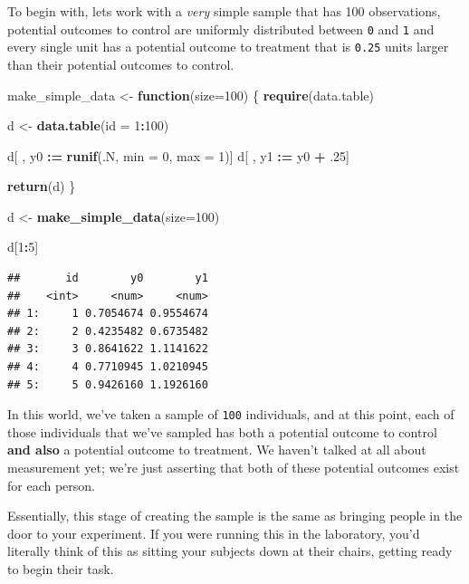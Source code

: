 \documentclass[
]{article}
\newenvironment{Shaded}{\begin{snugshade}}{\end{snugshade}}
\newcommand{\AttributeTok}[1]{\textcolor[rgb]{0.13,0.29,0.53}{#1}}
\newcommand{\ControlFlowTok}[1]{\textcolor[rgb]{0.13,0.29,0.53}{\textbf{#1}}}
\newcommand{\DecValTok}[1]{\textcolor[rgb]{0.00,0.00,0.81}{#1}}
\newcommand{\FunctionTok}[1]{\textcolor[rgb]{0.13,0.29,0.53}{\textbf{#1}}}
\newcommand{\NormalTok}[1]{#1}
\newcommand{\OtherTok}[1]{\textcolor[rgb]{0.56,0.35,0.01}{#1}}
\newcommand{\SpecialCharTok}[1]{\textcolor[rgb]{0.81,0.36,0.00}{\textbf{#1}}}
\theoremstyle{definition}
\theoremstyle{definition}
\theoremstyle{definition}
\theoremstyle{definition}
\theoremstyle{remark}
\begin{document}
To begin with, lets work with a \emph{very} simple sample that has 100 observations, potential outcomes to control are uniformly distributed between \texttt{0} and \texttt{1} and every single unit has a potential outcome to treatment that is \texttt{0.25} units larger than their potential outcomes to control.

\begin{Shaded}
\begin{Highlighting}[]
\NormalTok{make\_simple\_data }\OtherTok{\textless{}{-}} \ControlFlowTok{function}\NormalTok{(}\AttributeTok{size=}\DecValTok{100}\NormalTok{) \{ }
  \FunctionTok{require}\NormalTok{(data.table) }
  
\NormalTok{  d }\OtherTok{\textless{}{-}} \FunctionTok{data.table}\NormalTok{(}\AttributeTok{id =} \DecValTok{1}\SpecialCharTok{:}\DecValTok{100}\NormalTok{)  }
  
\NormalTok{  d[ , y0 }\SpecialCharTok{:=} \FunctionTok{runif}\NormalTok{(.N, }\AttributeTok{min =} \DecValTok{0}\NormalTok{, }\AttributeTok{max =} \DecValTok{1}\NormalTok{)]}
\NormalTok{  d[ , y1 }\SpecialCharTok{:=}\NormalTok{ y0 }\SpecialCharTok{+}\NormalTok{ .}\DecValTok{25}\NormalTok{]}
  
  \FunctionTok{return}\NormalTok{(d)}
\NormalTok{  \}}

\NormalTok{d }\OtherTok{\textless{}{-}} \FunctionTok{make\_simple\_data}\NormalTok{(}\AttributeTok{size=}\DecValTok{100}\NormalTok{)}

\NormalTok{d[}\DecValTok{1}\SpecialCharTok{:}\DecValTok{5}\NormalTok{]}
\end{Highlighting}
\end{Shaded}

\begin{verbatim}
##       id        y0        y1
##    <int>     <num>     <num>
## 1:     1 0.7054674 0.9554674
## 2:     2 0.4235482 0.6735482
## 3:     3 0.8641622 1.1141622
## 4:     4 0.7710945 1.0210945
## 5:     5 0.9426160 1.1926160
\end{verbatim}

In this world, we've taken a sample of \texttt{100} individuals, and at this point, each of those individuals that we've sampled has both a potential outcome to control \textbf{and also} a potential outcome to treatment. We haven't talked at all about measurement yet; we're just asserting that both of these potential outcomes exist for each person.

Essentially, this stage of creating the sample is the same as bringing people in the door to your experiment. If you were running this in the laboratory, you'd literally think of this as sitting your subjects down at their chairs, getting ready to begin their task.
\end{document}
